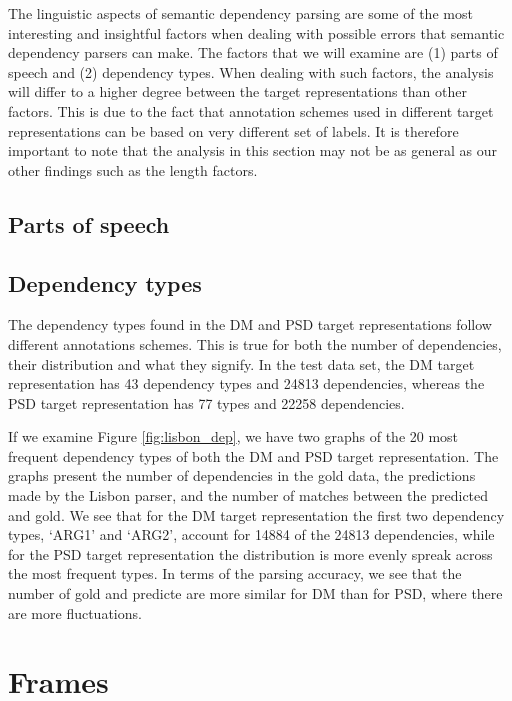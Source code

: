 The linguistic aspects of semantic dependency parsing are some of the most interesting and insightful factors when dealing with possible errors that semantic dependency parsers can make. The factors that we will examine are (1) parts of speech and (2) dependency types. When dealing with such factors, the analysis will differ to a higher degree between the target representations than other factors. This is due to the fact that annotation schemes used in different target representations can be based on very different set of labels. It is therefore important to note that the analysis in this section may not be as general as our other findings such as the length factors.

\subsection{Parts of speech}

\subsection{Dependency types}

The dependency types found in the DM and PSD target representations follow different annotations schemes. This is true for both the number of dependencies, their distribution and what they signify. In the test data set, the DM target representation has 43 dependency types and 24813 dependencies, whereas the PSD target representation has 77 types and 22258 dependencies.

If we examine Figure \ref{fig:lisbon_dep}, we have two graphs of the 20 most frequent dependency types of both the DM and PSD target representation. The graphs present the number of dependencies in the gold data, the predictions made by the Lisbon parser, and the number of matches between the predicted and gold. We see that for the DM target representation the first two dependency types, `ARG1' and `ARG2', account for 14884 of the 24813 dependencies, while for the PSD target representation the distribution is more evenly spreak across the most frequent types. In terms of the parsing accuracy, we see that the number of gold and predicte are more similar for DM than for PSD, where there are more fluctuations.



\section{Frames}


